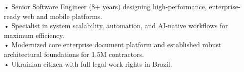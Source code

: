 

\begin{cvparagraph}
• Senior Software Engineer (8+ years) designing high-performance, enterprise-ready web and mobile platforms.\\
• Specialist in system scalability, automation, and AI-native workflows for maximum efficiency.\\
• Modernized core enterprise document platform and established robust architectural foundations for 1.5M contractors.\\
• Ukrainian citizen with full legal work rights in Brazil.
\end{cvparagraph}
